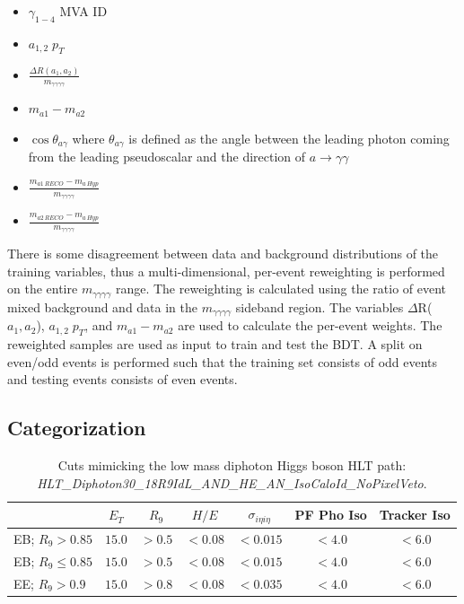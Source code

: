 \documentclass[12pt]{article}
\begin{document}
\begin{itemize}
   \item $\gamma_{1-4}$ MVA ID
   \item $a_{1,2}\; p_T$
   \item $\frac{\Delta R(a_{1}, a_{2})}{m_{\gamma\gamma\gamma\gamma}}$
   \item $m_{a1} - m_{a2}$
   \item $\cos\theta_{a\gamma}$ where $\theta_{a\gamma}$ is defined as the angle between the leading photon coming from the leading pseudoscalar and the direction of $a\rightarrow\gamma\gamma$
   \item $\frac{m_{a1\,RECO} - m_{a\, Hyp}}{m_{\gamma\gamma\gamma\gamma}}$
   \item $\frac{m_{a2\,RECO} - m_{a\, Hyp}}{m_{\gamma\gamma\gamma\gamma}}$
\end{itemize}


There is some disagreement between data and background distributions of the training variables, thus a multi-dimensional, per-event reweighting is performed on the entire $m_{\gamma\gamma\gamma\gamma}$ range. The reweighting is calculated using the ratio of event mixed background and data in the $m_{\gamma\gamma\gamma\gamma}$ sideband region. The variables $\Delta$R($a_1,a_2$), $a_{1,2}\; p_T$, and $m_{a1} - m_{a2}$ are used to calculate the per-event weights. The reweighted samples are used as input to train and test the BDT. A split on even/odd events is performed such that the training set consists of odd events and testing events consists of even events.\par


\subsection{Categorization}
\begin{table}
   \centering
   \begin{tabular}{l|c|c|c|c|c|c}
        & $E_T$ & $R_9$ & $H/E$ & $\sigma_{i\eta i\eta}$ & PF Pho Iso & Tracker Iso\\ \hline
       EB; $R_9>0.85$ & $15.0$ & $> 0.5$ & $<0.08$ & $<0.015$ & $<4.0$ & $<6.0$\\
       EB; $R_9\leq0.85$ & $15.0$ & $> 0.5$ & $<0.08$ & $<0.015$ & $<4.0$ & $<6.0$\\
       EE; $R_9>0.9$ & $15.0$ & $> 0.8$ & $<0.08$ & $<0.035$ & $<4.0$ & $<6.0$
   \end{tabular}
   \caption{Cuts mimicking the low mass diphoton Higgs boson HLT path:\\ \textit{HLT\_Diphoton30\_18R9IdL\_AND\_HE\_AN\_IsoCaloId\_NoPixelVeto}.}
   \label{tab:hlt_cuts_2018}
\end{table}
\end{document}
